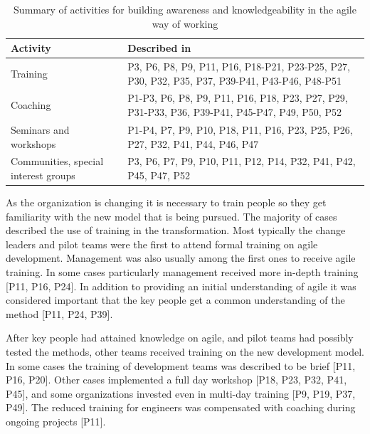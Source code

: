 \documentclass[preprint,authoryear,12pt]{elsarticle}
\begin{document}
\begin{table}[h]
    \centering
    \begin{tabular}{ >{\raggedright\arraybackslash}p{}
                     >{\raggedright\arraybackslash}p{} }
        \toprule
        Activity           &  Described in  \\
        \midrule
        Training    &
                P3, P6, P8, P9, P11, P16, P18-P21, P23-P25, P27, P30,
                P32, P35, P37, P39-P41, P43-P46, P48-P51  \\  %
        Coaching    &
                P1-P3, P6, P8, P9, P11, P16, P18, P23, P27, P29,
                P31-P33, P36, P39-P41, P45-P47, P49, P50, P52  \\  %
        Seminars and workshops   &
                P1-P4, P7, P9, P10, P18, P11, P16, P23, P25,
                P26, P27, P32, P41, P44, P46, P47   \\   %
        Communities, special interest groups  &
                P3, P6, P7, P9, P10, P11, P12, P14, P32, P41,
                P42, P45, P47, P52  \\   %
        \bottomrule
    \end{tabular}
    \caption{Summary of activities for building awareness and knowledgeability
             in the agile way of working}
    \label{table:transformation_training}
\end{table}



As the organization is changing it is necessary to train people so they get
familiarity with the new model that is being pursued. The majority of cases
described the use of training in the transformation.
Most typically the change leaders and pilot teams were the first to attend
formal training on agile development. Management was also usually among the
first ones to receive agile training. In some cases particularly management
received more in-depth training [P11, P16, P24]. In addition to providing an initial
understanding of agile it was considered important that the key people get a
common understanding of the method [P11, P24, P39].

After key people had attained knowledge on agile, and pilot teams had possibly
tested the methods, other teams received training on the new development model.
In some cases the training of development teams was described to be brief [P11,
P16, P20]. Other cases implemented a full day workshop [P18, P23, P32, P41,
P45], and some organizations invested even in multi-day training [P9, P19, P37,
P49].
The reduced training for engineers was compensated with coaching during ongoing
projects [P11].
\end{document}
